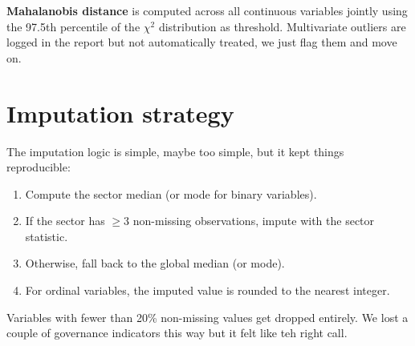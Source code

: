 \textbf{Mahalanobis distance} is computed across all continuous variables jointly using the 97.5th percentile of the $\chi^2$ distribution as threshold. Multivariate outliers are logged in the report but not automatically treated, we just flag them and move on.

\section{Imputation strategy}

The imputation logic is simple, maybe too simple, but it kept things reproducible:

\begin{enumerate}
    \item Compute the sector median (or mode for binary variables).
    \item If the sector has $\geq 3$ non-missing observations, impute with the sector statistic.
    \item Otherwise, fall back to the global median (or mode).
    \item For ordinal variables, the imputed value is rounded to the nearest integer.
\end{enumerate}

Variables with fewer than 20\% non-missing values get dropped entirely. We lost a couple of governance indicators this way but it felt like teh right call.
